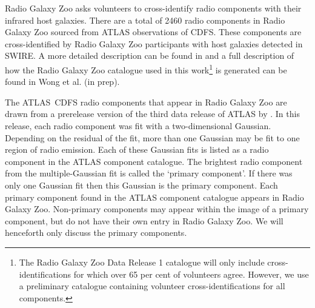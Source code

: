     Radio Galaxy Zoo asks volunteers to cross-identify radio components with
    their infrared host galaxies. There are a total of 2460 radio components
    in Radio Galaxy Zoo sourced from ATLAS {observations of CDFS}. These components are
    cross-identified by Radio Galaxy Zoo participants with host galaxies
    detected in SWIRE. A more detailed description can be found in
    \citet{banfield15} and a full description of how the Radio Galaxy Zoo catalogue used in this work\footnote{The Radio Galaxy Zoo Data
    Release 1 catalogue will only include cross-identifications for which over
    65 per cent of volunteers agree. However, we use a preliminary catalogue containing volunteer
    cross-identifications for all components.} is generated can be found in Wong
    et al. (in prep).

    The ATLAS~CDFS radio components that appear in Radio Galaxy Zoo {are drawn from a prerelease version of} the third data release
    of ATLAS by \citet{franzen15}. In this release, each radio component was fit with a
    two-dimensional Gaussian. Depending on the residual of the fit, more than
    one Gaussian may be fit to one region of radio emission. Each of these
    Gaussian fits is listed as a radio component in the ATLAS component catalogue. The
    brightest radio component from the multiple-Gaussian fit is called the
    `primary component'. {If there was only one Gaussian fit then this Gaussian is the primary component}. Each primary component found in the ATLAS
    component catalogue appears in Radio Galaxy Zoo. Non-primary components
    may appear within the image of a primary component, but do not have their
    own entry in Radio Galaxy Zoo. We will henceforth only discuss the primary
    components.

